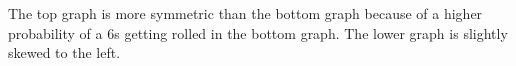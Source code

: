 \documentclass[addpoints, 11pt]{exam}
\begin{document}
\begin{questions}
\begin{parts}
	The top graph is more symmetric than the bottom graph because of a higher probability of a $6$s getting rolled in the bottom graph. The lower graph is slightly skewed to the left.
\end{parts}
%

\end{questions}
\end{document}
